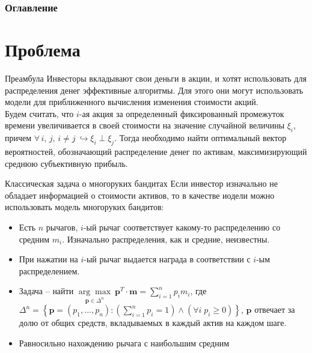 \documentclass[11pt]{beamer} %
\begin{document}
\setsansfont{Noto Sans} %

\frame{\titlepage} %


\begin{frame}
    \frametitle{Оглавление}
    \tableofcontents
\end{frame}


\section{Проблема}
    \begin{frame}{Преамбула}
        Инвесторы вкладывают свои деньги в акции, и хотят использовать для распределения денег эффективные алгоритмы. Для этого они могут использовать модели для приближенного вычисления изменения стоимости акций. \pause \\
        Будем считать, что $i$-ая акция за определенный фиксированный промежуток времени увеличивается в своей стоимости на значение случайной величины $\xi_i$, причем $\forall \, i,\, j,\, i \neq j\: \hookrightarrow \xi_i \perp \xi_j$. \pause Тогда необходимо найти оптимальный вектор вероятностей, обозначающий распределение денег по активам, максимизирующий среднюю субъективную прибыль.
    \end{frame}
    \begin{frame}{Классическая задача о многоруких бандитах}
        Если инвестор изначально не обладает информацией о стоимости активов, то в качестве иодели можно использовать модель многоруких бандитов: \pause
        \begin{itemize}
            \item<1-> Есть $n$ рычагов, $i$-ый рычаг соответствует какому-то распределению со средним $m_i$. Изначально распределения, как и средние, неизвестны.
            \item<2-> При нажатии на $i$-ый рычаг выдается награда в соответствии с $i$-ым распределением.
            \item<3-> Задача -- найти $\underset{\textbf{p} \in \Delta^n}{\arg \max} \: \textbf{p}^T \cdot \textbf{m} = \sum_{i=1}^n p_i m_i$, где $\Delta^n = \left\{ \textbf{p} = (p_1, ..., p_n) : \left(\sum_{i=1}^n p_i = 1\right) \wedge (\forall i \; p_i \geqslant 0) \right\}$, $\textbf{p}$ отвечает за долю от общих средств, вкладываемых в каждый актив на каждом шаге.
            \item<4-> Равносильно нахождению рычага с наибольшим средним
        \end{itemize}
    \end{frame}
\end{document}
